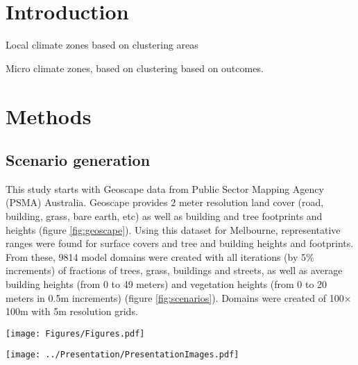 \documentclass[final,3p,times,authoryear]{elsarticle}
\begin{document}
\maketitle

\section{Introduction}

Local climate zones based on clustering areas

Micro climate zones, based on clustering based on outcomes.

\section{Methods}\label{sec:methods}

\subsection{Scenario generation}\label{sec:methodsgen}
This study starts with Geoscape \citep{Geoscape2020} data from Public Sector Mapping Agency (PSMA) Australia. Geoscape provides 2 meter resolution land cover (road, building, grass, bare earth, etc) as well as building and tree footprints and heights (figure \ref{fig:geoscape}). Using this dataset for Melbourne, representative ranges were found for surface covers and tree and building heights and footprints. From these, 9814 model domains were created with all iterations (by 5\% increments) of fractions of trees, grass, buildings and streets, as well as average building heights (from 0 to 49 meters) and vegetation heights (from 0 to 20 meters in 0.5m increments) (figure \ref{fig:scenarios}). Domains were created of 100$\times$100m with 5m resolution grids.



\begin{figure*}
\centering
\texttt{[image: Figures/Figures.pdf]}
\caption{\bf 2m surface cover (bare earth, roads, grass, trees, water, and buildings), building footprints and heights, and tree cover locations and heights from Geoscape for Melbourne.}
 \label{fig:geoscape}
\end{figure*} 

\begin{figure*}
\centering
\texttt{[image: ../Presentation/PresentationImages.pdf]}
\caption{\bf Melbourne, parameter ranges.}
\end{figure*} 
\end{document}
